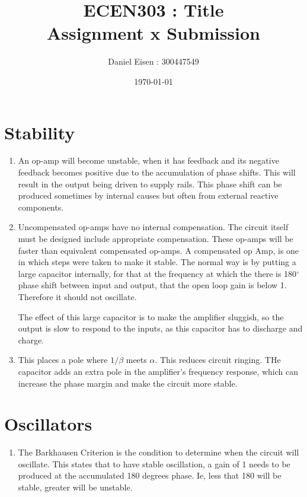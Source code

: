 \documentclass[11pt]{article}
\title{ECEN303 : Title \\ Assignment x Submission}
\author{Daniel Eisen : 300447549}
\date{\today}
\begin{document}
\begin{preview}
\maketitle
\section*{Stability}
\begin{enumerate}
        \item An op-amp will become unstable, when it has feedback and its negative feedback becomes positive due to the accumulation of phase shifts. This will result in the output being driven to supply rails. This phase shift can be produced sometimes by internal causes but often from external reactive components.
        
        \item Uncompensated op-amps have no internal compensation.
        The circuit itself must be designed include appropriate compensation. These op-amps will be faster than equivalent compensated op-amps.
        A compensated op Amp, is one in which steps were taken to make it stable. The normal way is by putting a large capacitor internally, for that at the frequency at which the there is 180$^\circ$ phase shift between input and output, that the open loop gain is below 1. Therefore it should not oscillate.

        The effect of this large capacitor is to make the amplifier sluggish, so the output is slow to respond to the inputs, as this capacitor has to discharge and charge.
        
        \item This places a pole where $1/\beta$ meets $\alpha$. This reduces circuit ringing. THe capacitor adds an extra pole in the amplifier's frequency response, which can increase the phase margin and make the circuit more stable.
\end{enumerate}


\section*{Oscillators}
\begin{enumerate}
        \item The Barkhausen Criterion is the condition to determine when the circuit will oscillate. This states that to have stable oscillation, a gain of 1 needs to be produced at the accumulated 180 degrees phase. Ie, less that 180 will be stable, greater will be unstable.
        

\end{enumerate}
\end{preview}
\end{document}
